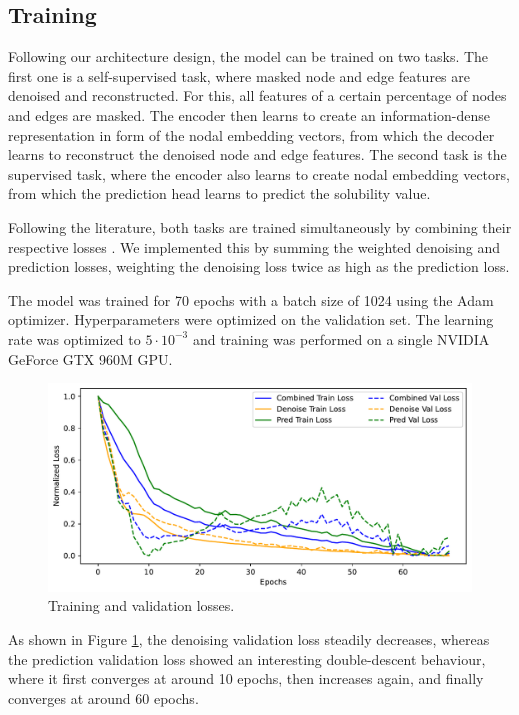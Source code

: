 \documentclass[11pt,a4paper]{article}
\begin{document}
\subsection{Training}

Following our architecture design, the model can be trained on two tasks. The first one is a self-supervised task, where masked node and edge features are denoised and reconstructed. For this, all features of a certain percentage of nodes and edges are masked. The encoder then learns to create an information-dense representation in form of the nodal embedding vectors, from which the decoder learns to reconstruct the denoised node and edge features. The second task is the supervised task, where the encoder also learns to create nodal embedding vectors, from which the prediction head learns to predict the solubility value.

Following the literature, both tasks are trained simultaneously by combining their respective losses \cite{cui2025online, wang2022test}. We implemented this by summing the weighted denoising and prediction losses, weighting the denoising loss twice as high as the prediction loss.

The model was trained for 70 epochs with a batch size of 1024 using the Adam optimizer. Hyperparameters were optimized on the validation set. The learning rate was optimized to $5 \cdot 10^{-3}$ and training was performed on a single NVIDIA GeForce GTX 960M GPU.

\begin{figure}[htbp]
        \centering
        \includegraphics[width=1\textwidth]{loss_plot.pdf}
        \caption{Training and validation losses.}
        \label{fig:loss_plot}
\end{figure}

As shown in Figure \ref{fig:loss_plot}, the denoising validation loss steadily decreases, whereas the prediction validation loss showed an interesting double-descent behaviour, where it first converges at around 10 epochs, then increases again, and finally converges at around 60 epochs.
\end{document}
